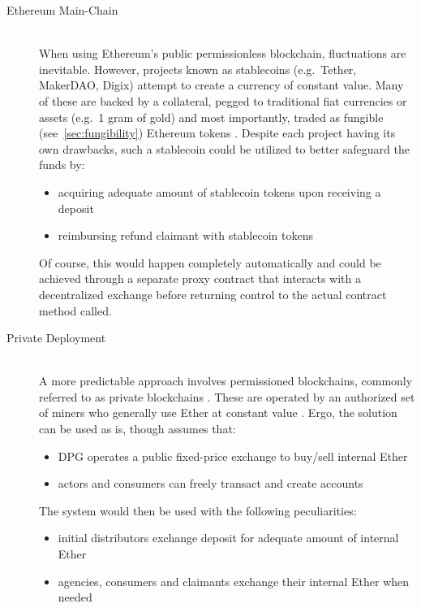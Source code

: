 \begin{description}
	\item[Ethereum Main-Chain]
	\hfill \\
	When using Ethereum's public permissionless blockchain, fluctuations are inevitable. However, projects known as stablecoins (e.g.~Tether, MakerDAO, Digix) attempt to create a currency of constant value. Many of these are backed by a collateral, pegged to traditional fiat currencies or assets (e.g.~1 gram of gold) and most importantly, traded as fungible (see~\ref{sec:fungibility}) Ethereum tokens \cite{stablecoins}. Despite each project having its own drawbacks, such a stablecoin could be utilized to better safeguard the funds by: 
	
	\begin{itemize}
  		\item acquiring adequate amount of stablecoin tokens upon receiving a deposit
  		\item reimbursing refund claimant with stablecoin tokens
	\end{itemize}

	Of course, this would happen completely automatically and could be achieved through a separate proxy contract that interacts with a decentralized exchange before returning control to the actual contract method called. 
	
	\item[Private Deployment]
	\hfill \\
	A more predictable approach involves permissioned blockchains, commonly referred to as private blockchains \cite[p.~37]{nist2018}. These are operated by an authorized set of miners who generally use Ether at constant value \cite[p.~36]{nist2018}. Ergo, the solution can be used as is, though assumes that:

	\begin{itemize}
  		\item \ac{DPG} operates a public fixed-price exchange to buy/sell internal Ether
  		\item actors and consumers can freely transact and create accounts
	\end{itemize}
	
	The system would then be used with the following peculiarities:
		
	\begin{itemize}
  		\item initial distributors exchange deposit for adequate amount of internal Ether 
  		\item agencies, consumers and claimants exchange their internal Ether when needed
	\end{itemize}
	

\end{description}
